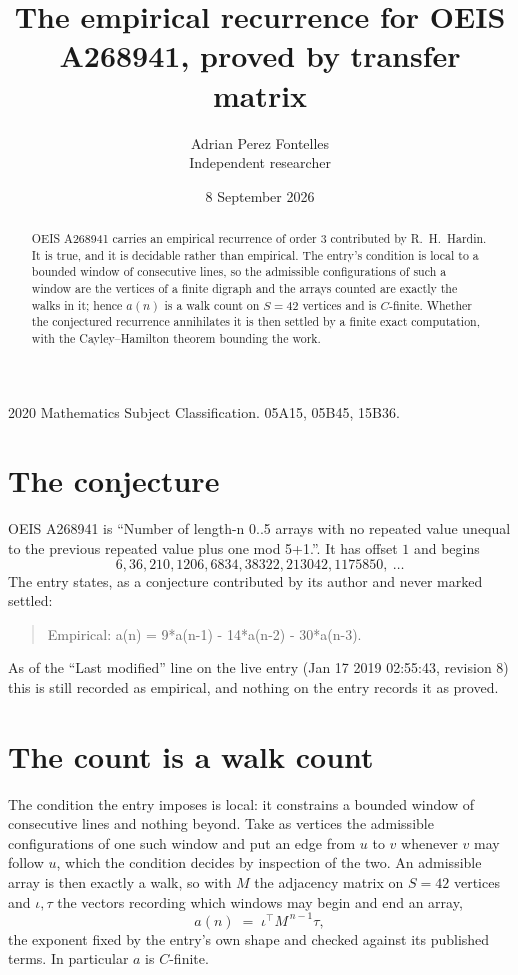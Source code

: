 \documentclass[11pt,a4paper]{article}
\title{The empirical recurrence for OEIS A268941, proved by transfer matrix}
\author{Adrian Perez Fontelles\\ \small Independent researcher}
\date{8 September 2026}
\theoremstyle{plain}
\theoremstyle{definition}
\begin{document}
\maketitle

\begin{abstract}
OEIS A268941 carries an empirical recurrence of order $3$ contributed by R.~H.~Hardin. It is
true, and it is decidable rather than empirical. The entry's condition is local to a bounded window of consecutive lines, so
the admissible configurations of such a window are the vertices of a finite digraph and the
arrays counted are exactly the walks in it; hence $a(n)$ is a walk count on $S=42$ vertices
and is $C$-finite. Whether the conjectured recurrence annihilates it is then settled by a
finite exact computation, with the Cayley--Hamilton theorem bounding the work.
\end{abstract}

\noindent\small 2020 Mathematics Subject Classification. 05A15, 05B45, 15B36.\normalsize

\section{The conjecture}

OEIS A268941 is ``Number of length-n 0..5 arrays with no repeated value unequal to the previous repeated value plus one mod 5+1.''. It has offset $1$ and begins
\[
6, 36, 210, 1206, 6834, 38322, 213042, 1175850,\ \dots
\]
The entry states, as a conjecture contributed by its author and never marked settled:
\begin{quote}
Empirical: a(n) = 9*a(n-1) - 14*a(n-2) - 30*a(n-3).
\end{quote}
As of the ``Last modified'' line on the live entry (Jan 17 2019 02:55:43, revision 8) this is still
recorded as empirical, and nothing on the entry records it as proved.

\section{The count is a walk count}

The condition the entry imposes is local: it constrains a bounded window of consecutive lines and nothing beyond. Take as
vertices the admissible configurations of one such window and put an edge from $u$ to $v$
whenever $v$ may follow $u$, which the condition decides by inspection of the two. An
admissible array is then exactly a walk, so with $M$ the adjacency matrix on $S=42$ vertices
and $\iota,\tau$ the vectors recording which windows may begin and end an array,
\[
a(n)\;=\;\iota^{\!\top}M^{\,n-1}\tau ,
\]
the exponent fixed by the entry's own shape and checked against its published terms. In
particular $a$ is $C$-finite.
\end{document}
